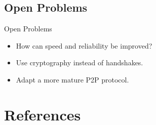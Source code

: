 \documentclass{beamer}
\begin{document}
\subsection{Open Problems}
\begin{frame}{Open Problems}
\begin{itemize}
\item How can speed and reliability be improved?

\pause
\item Use cryptography instead of handshakes.

\pause
\item Adapt a more mature P2P protocol.
\end{itemize}
\end{frame}

\appendix
\section{References}
~\nocite{tor-design}
~\nocite{chaum-mix}
~\nocite{tor-chat}
~\nocite{wiki-spoofing}
~\nocite{tor-control}
~\nocite{tor-ctl}


\end{document}
